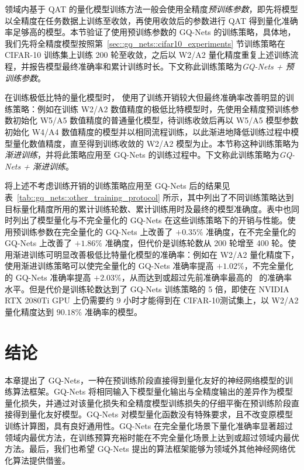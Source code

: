\documentclass[
  fontset = mac,
]{shtthesis}
\begin{document}
领域内基于 QAT 的量化模型训练方法一般会使用全精度\emph{预训练参数}，即先将模型以全精度在任务数据上训练至收敛，再使用收敛后的参数进行 QAT 得到量化准确率足够高的模型。本节验证了使用预训练参数的 GQ-Nets 的训练策略，具体地，我们先将全精度模型按照第~\ref{sec::gq_nets::cifar10_experiments} 节训练策略在 CIFAR-10 训练集上训练 200 轮至收敛，之后以 W2/A2 量化精度重复上述训练流程，并报告模型最终准确率和累计训练时长。下文称此训练策略为\emph{GQ-Nets + 预训练参数}。

在训练极低比特的量化模型时，\citet{li2019additive} 使用了训练开销较大但最终准确率改善明显的训练策略：例如在训练 W2/A2 数值精度的极低比特模型时，先使用全精度预训练参数初始化 W5/A5 数值精度的普通量化模型，待训练收敛后再以 W5/A5 模型参数初始化 W4/A4 数值精度的模型并以相同流程训练，以此渐进地降低训练过程中模型量化数值精度，直至得到训练收敛的 W2/A2 模型为止。本节称这种训练策略为\emph{渐进训练}，并将此策略应用至 GQ-Nets 的训练过程中。下文称此训练策略为\emph{GQ-Nets + 渐进训练}。

将上述不考虑训练开销的训练策略应用至 GQ-Nets 后的结果见表~\ref{tab::gq_nets::other_training_protocol} 所示，其中列出了不同训练策略达到目标量化精度所用的累计训练轮数、累计训练用时及最终的模型准确度。表中也同时列出了模型量化与不完全量化的 GQ-Nets 在这些训练策略下的开销与性能。使用预训练参数在完全量化的 GQ-Nets 上改善了 $+0.35\%$ 准确度，在不完全量化的 GQ-Nets 上改善了 $+1.86\%$ 准确度，但代价是训练轮数从 200 轮增至 400 轮。使用渐进训练可明显改善极低比特量化模型的准确率：例如在 W2/A2 量化精度下，使用渐进训练策略可以使完全量化的 GQ-Nets 准确率提高 $+1.02\%$，不完全量化的 GQ-Nets 准确率提高 $+2.03\%$，从而达到或超过先前准确率最高的~\citet{Zhang_2018, li2019additive} 的准确率水平。但是代价是训练轮数达到了 GQ-Nets 训练策略的 5 倍，即使在 NVIDIA RTX 2080Ti GPU 上仍需要约 9 小时才能得到在 CIFAR-10测试集上，以 W2/A2 量化精度达到 $90.18\%$ 准确率的模型。
\section{结论}
本章提出了 GQ-Nets，一种在预训练阶段直接得到量化友好的神经网络模型的训练算法框架。GQ-Nets 将相同输入下模型量化输出与全精度输出的差异作为模型量化损失，并通过对该量化损失和全精度模型训练损失的仔细平衡在预训练阶段直接得到量化友好模型。GQ-Nets 对模型量化函数没有特殊要求，且不改变原模型训练计算图，具有良好通用性。GQ-Nets 在完全量化场景下量化准确率显著超过领域内最优方法，在训练预算充裕时能在不完全量化场景上达到或超过领域内最优方法。最后，我们也希望 GQ-Nets 提出的算法框架能够为领域外其他神经网络优化算法提供借鉴。
\end{document}

